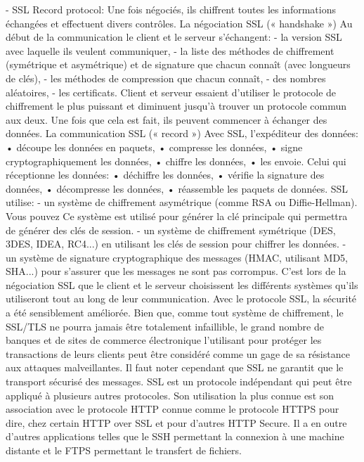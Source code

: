 -	SSL Record protocol: Une fois négociés, ils chiffrent toutes les informations échangées et effectuent divers contrôles.
La négociation SSL (« handshake »)
Au début de la communication le client et le serveur s'échangent:
-	la version SSL avec laquelle ils veulent communiquer,
-	la liste des méthodes de chiffrement (symétrique et asymétrique) et de signature que chacun connaît (avec longueurs de clés),
-	les méthodes de compression que chacun connaît,
-	des nombres aléatoires,
-	les certificats.
Client et serveur essaient d'utiliser le protocole de chiffrement le plus puissant et diminuent jusqu'à trouver un protocole commun aux deux. Une fois que cela est fait, ils peuvent commencer à échanger des données. 
La communication SSL (« record »)
Avec SSL, l'expéditeur des données:
•	découpe les données en paquets,
•	compresse les données,
•	signe cryptographiquement les données,
•	chiffre les données,
•	les envoie.
Celui qui réceptionne les données:
•	déchiffre les données,
•	vérifie la signature des données,
•	décompresse les données,
•	réassemble les paquets de données.
SSL utilise:
-	un système de chiffrement asymétrique (comme RSA ou Diffie-Hellman). Vous pouvez Ce système est utilisé pour générer la clé principale qui permettra de générer des clés de session.
-	un système de chiffrement symétrique (DES, 3DES, IDEA, RC4...) en utilisant les clés de session pour chiffrer les données.
-	un système de signature cryptographique des messages (HMAC, utilisant MD5, SHA...) pour s'assurer que les messages ne sont pas corrompus.
C'est lors de la négociation SSL que le client et le serveur choisissent les différents systèmes qu’ils utiliseront tout au long de leur communication.
Avec le protocole SSL, la sécurité a été sensiblement améliorée. Bien que, comme tout système de chiffrement, le SSL/TLS ne pourra jamais être totalement infaillible, le grand nombre de banques et de sites de commerce électronique l'utilisant pour protéger les transactions de leurs clients peut être considéré comme un gage de sa résistance aux attaques malveillantes. Il faut noter cependant que SSL ne garantit que le transport sécurisé des messages.
SSL est un protocole indépendant qui peut être appliqué à plusieurs autres protocoles. Son utilisation la plus connue est son association avec le protocole HTTP connue comme le protocole HTTPS pour dire, chez certain HTTP over SSL et pour d’autres HTTP Secure. Il a en outre d’autres applications telles que le SSH permettant la connexion à une machine distante et le FTPS permettant le transfert de fichiers.


